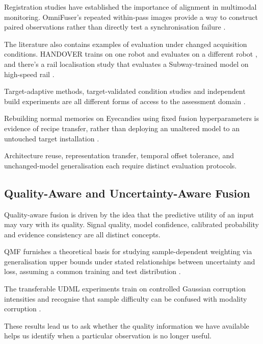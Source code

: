 Registration studies have established the importance of alignment in multimodal monitoring.
OmniFuser's repeated within-pass images provide a way to construct paired observations rather than
directly test a synchronisation failure \parencite{Petrich2021Multimodal,Chen2023Multisensor,P021}.

The literature also contains examples of evaluation under changed acquisition conditions. HANDOVER
trains on one robot and evaluates on a different robot \parencite[Table~V]{Thoduka2024Handover}, and there's a rail localisation study that
evaluates a Subway-trained model on high-speed rail
\parencite[Table~III]{P031}.

Target-adaptive methods, target-validated condition studies and independent build experiments are
all different forms of access to the assessment domain
\parencite{Wang2025A,Chu2024A,Huang2026Rolling,Bevans2023Heterogeneous}.

Rebuilding normal memories on Eyecandies using fixed fusion hyperparameters is evidence of recipe
transfer, rather than deploying an unaltered model to an untouched target installation
\parencite{P026,P033}.

Architecture reuse, representation transfer, temporal offset tolerance, and unchanged-model generalisation each require distinct evaluation protocols.

\subsection{Quality-Aware and Uncertainty-Aware Fusion}

Quality-aware fusion is driven by the idea that the predictive utility of an input may vary with its
quality. Signal quality, model confidence, calibrated probability and evidence consistency are all
distinct concepts.

QMF furnishes a theoretical basis for studying sample-dependent weighting via generalisation upper
bounds under stated relationships between uncertainty and loss, assuming a common training and test
distribution \parencite[Sections~3.1--3.2]{Zhang2023QMF}.

The transferable UDML experiments train on controlled Gaussian corruption intensities and recognise
that sample difficulty can be confused with modality corruption \parencite[pp.~4--5, 9]{P022}.

These results lead us to ask whether the quality information we have available helps us identify
when a particular observation is no longer useful.

